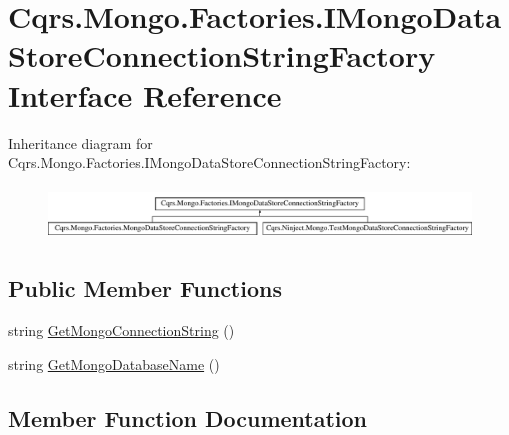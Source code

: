 \hypertarget{interfaceCqrs_1_1Mongo_1_1Factories_1_1IMongoDataStoreConnectionStringFactory}{}\section{Cqrs.\+Mongo.\+Factories.\+I\+Mongo\+Data\+Store\+Connection\+String\+Factory Interface Reference}
\label{interfaceCqrs_1_1Mongo_1_1Factories_1_1IMongoDataStoreConnectionStringFactory}
Inheritance diagram for Cqrs.\+Mongo.\+Factories.\+I\+Mongo\+Data\+Store\+Connection\+String\+Factory\+:\begin{figure}[H]
\begin{center}
\leavevmode
\includegraphics[height=1.417722cm]{interfaceCqrs_1_1Mongo_1_1Factories_1_1IMongoDataStoreConnectionStringFactory}
\end{center}
\end{figure}
\subsection*{Public Member Functions}
\begin{DoxyCompactItemize}
\item 
string \hyperlink{interfaceCqrs_1_1Mongo_1_1Factories_1_1IMongoDataStoreConnectionStringFactory_ad8ea94d071ebedf6b137a0b99c2cc12c_ad8ea94d071ebedf6b137a0b99c2cc12c}{Get\+Mongo\+Connection\+String} ()
\item 
string \hyperlink{interfaceCqrs_1_1Mongo_1_1Factories_1_1IMongoDataStoreConnectionStringFactory_a90de27c2bf23d7f9412d55c09ab2ec8c_a90de27c2bf23d7f9412d55c09ab2ec8c}{Get\+Mongo\+Database\+Name} ()
\end{DoxyCompactItemize}


\subsection{Member Function Documentation}
\mbox{\label{interfaceCqrs_1_1Mongo_1_1Factories_1_1IMongoDataStoreConnectionStringFactory_ad8ea94d071ebedf6b137a0b99c2cc12c_ad8ea94d071ebedf6b137a0b99c2cc12c}} 
